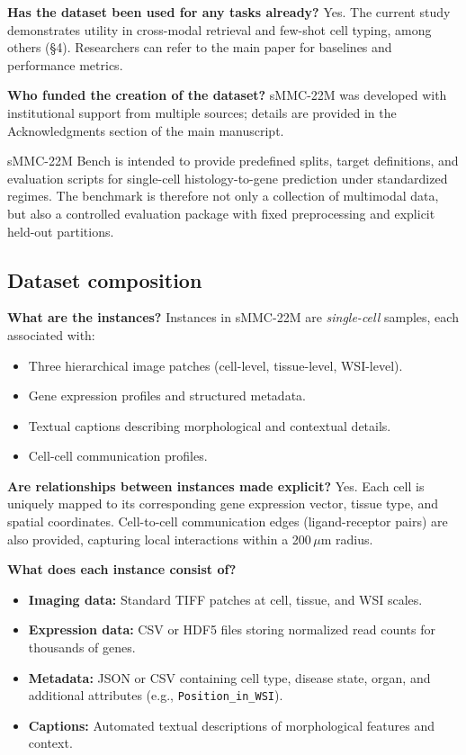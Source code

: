 \documentclass[sigconf,review]{acmart}
\newcommand{\dataset}{sMMC-22M\xspace}
\newcommand{\datasheetq}[1]{\par\noindent\textbf{#1}\enspace}
\begin{document}
\datasheetq{Has the dataset been used for any tasks already?}
Yes. The current study demonstrates utility in cross-modal retrieval and few-shot cell typing, among others (\S4). Researchers can refer to the main paper for baselines and performance metrics.

\datasheetq{Who funded the creation of the dataset?}
\dataset was developed with institutional support from multiple sources; details are provided in the Acknowledgments section of the main manuscript.

\dataset Bench is intended to provide predefined splits, target definitions, and evaluation scripts for single-cell histology-to-gene prediction under standardized regimes. The benchmark is therefore not only a collection of multimodal data, but also a controlled evaluation package with fixed preprocessing and explicit held-out partitions.


\subsection{Dataset composition}
\datasheetq{What are the instances?}
Instances in \dataset are \textit{single-cell} samples, each associated with:
\begin{itemize}
    \item Three hierarchical image patches (cell-level, tissue-level, WSI-level).
    \item Gene expression profiles and structured metadata.
    \item Textual captions describing morphological and contextual details.
    \item Cell-cell communication profiles.
\end{itemize}

\datasheetq{Are relationships between instances made explicit?}
Yes. Each cell is uniquely mapped to its corresponding gene expression vector, tissue type, and spatial coordinates. Cell-to-cell communication edges (ligand-receptor pairs) are also provided, capturing local interactions within a 200\,$\mu$m radius.

\datasheetq{What does each instance consist of?}
\begin{itemize}
    \item \textbf{Imaging data:} Standard TIFF patches at cell, tissue, and WSI scales.
    \item \textbf{Expression data:} CSV or HDF5 files storing normalized read counts for thousands of genes.
    \item \textbf{Metadata:} JSON or CSV containing cell type, disease state, organ, and additional attributes (e.g., \texttt{Position\_in\_WSI}).
    \item \textbf{Captions:} Automated textual descriptions of morphological features and context.
\end{itemize}
\end{document}
